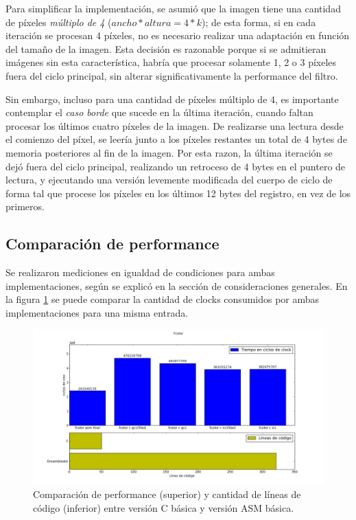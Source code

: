 Para simplificar la implementación, se asumió que la imagen tiene una cantidad de píxeles \emph{múltiplo de 4} ($ancho * altura = 4 * k$); de esta forma, si en cada iteración se procesan 4 píxeles, no es necesario realizar una adaptación en función del tamaño de la imagen. Esta decisión es razonable porque si se admitieran imágenes sin esta característica, habría que procesar solamente 1, 2 o 3 píxeles fuera del ciclo principal, sin alterar significativamente la performance del filtro.

Sin embargo, incluso para una cantidad de píxeles múltiplo de 4, es importante contemplar el \emph{caso borde} que sucede en la última iteración, cuando faltan procesar los últimos cuatro píxeles de la imagen. De realizarse una lectura desde el comienzo del píxel, se leería junto a los píxeles restantes un total de 4 bytes de memoria posteriores al fin de la imagen. Por esta razon, la última iteración se dejó fuera del ciclo principal, realizando un retroceso de 4 bytes en el puntero de lectura, y ejecutando una versión levemente modificada del cuerpo de ciclo de forma tal que procese los píxeles en los últimos 12 bytes del registro, en vez de los primeros.

\subsection{Comparación de performance}
\label{sub:comparaci_n_de_performance}

Se realizaron mediciones en igualdad de condiciones para ambas implementaciones, según se explicó en la sección de consideraciones generales. En la figura \ref{fig:filtro-color-C-vs-ASM} se puede comparar la cantidad de clocks consumidos por ambas implementaciones para una misma entrada.

\begin{figure}[H]
\begin{center}
  \includegraphics[scale=0.5]{secciones/filtro_color/graficos/fcolor.png}
\end{center}
\caption{Comparación de performance (superior) y cantidad de líneas de código (inferior) entre versión C básica y versión ASM básica.}
\label{fig:filtro-color-C-vs-ASM}
\end{figure}

